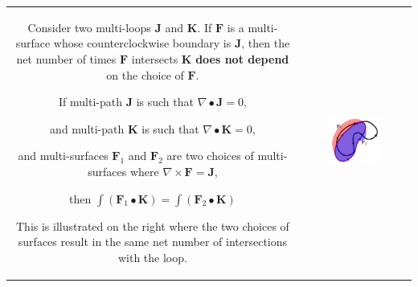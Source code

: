\begin{tabular}{cc}
\parbox{0.5\textwidth}{
Consider two multi-loops \(\mathbf{J}\) and \(\mathbf{K}\). If \(\mathbf{F}\) is a multi-surface whose counterclockwise boundary is \(\mathbf{J}\), then the net number of times \(\mathbf{F}\) intersects \(\mathbf{K}\) {\bf does not depend} on the choice of \(\mathbf{F}\). 

\begin{thm}
If multi-path \(\mathbf{J}\) is such that \(\nabla \bullet \mathbf{J} = 0\), 

and multi-path \(\mathbf{K}\) is such that \(\nabla \bullet \mathbf{K} = 0\),

and multi-surfaces \(\mathbf{F}_1\) and \(\mathbf{F}_2\) are two choices
of multi-surfaces where \(\nabla \times \mathbf{F} = \mathbf{J}\), 

then \(\int (\mathbf{F}_1 \bullet \mathbf{K}) = \int (\mathbf{F}_2 \bullet \mathbf{K})\)
\end{thm}

This is illustrated on the right where the two choices of surfaces result in the same net number of intersections with the loop.
} & \parbox{0.5\textwidth}{
\includegraphics[width = 0.5\textwidth]{Intersections/Path-surface_intersections/closed_path_and_different_surfaces}
}
\end{tabular}